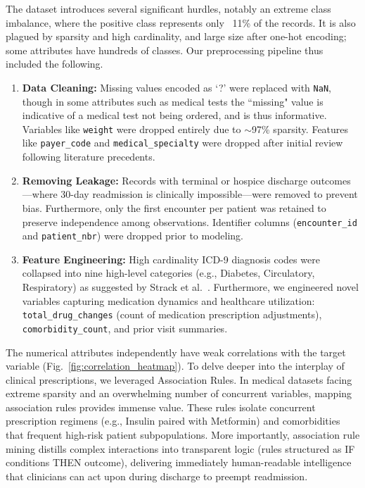 \documentclass[journal,onecolumn]{IEEEtran}
\begin{document}
The dataset introduces several significant hurdles, notably an extreme class imbalance, where the positive class represents only ~11\% of the records. It is also plagued by sparsity and high cardinality, and large size after one-hot encoding; some attributes have hundreds of classes. Our preprocessing pipeline thus included the following. 
\begin{enumerate}
    \item \textbf{Data Cleaning:} Missing values encoded as `?' were replaced with \texttt{NaN}, though in some attributes such as medical tests the ``missing" value is indicative of a medical test not being ordered, and is thus informative. Variables like \texttt{weight} were dropped entirely due to $\sim$97\% sparsity. Features like \texttt{payer\_code} and \texttt{medical\_specialty} were dropped after initial review following literature precedents. 
    \item \textbf{Removing Leakage:} Records with terminal or hospice discharge outcomes---where 30-day readmission is clinically impossible---were removed to prevent bias. Furthermore, only the first encounter per patient was retained to preserve independence among observations. Identifier columns (\texttt{encounter\_id} and \texttt{patient\_nbr}) were dropped prior to modeling.
    \item \textbf{Feature Engineering:} High cardinality ICD-9 diagnosis codes were collapsed into nine high-level categories (e.g., Diabetes, Circulatory, Respiratory) as suggested by Strack et al.~\cite{strack_impact_2014}. Furthermore, we engineered novel variables capturing medication dynamics and healthcare utilization: \texttt{total\_drug\_changes} (count of medication prescription adjustments), \texttt{comorbidity\_count}, and prior visit summaries.
\end{enumerate}

The numerical attributes independently have weak correlations with the target variable (Fig.~\ref{fig:correlation_heatmap}). To delve deeper into the interplay of clinical prescriptions, we leveraged Association Rules. In medical datasets facing extreme sparsity and an overwhelming number of concurrent variables, mapping association rules provides immense value. These rules isolate concurrent prescription regimens (e.g., Insulin paired with Metformin) and comorbidities that frequent high-risk patient subpopulations. More importantly, association rule mining distills complex interactions into transparent logic (rules structured as IF conditions THEN outcome), delivering immediately human-readable intelligence that clinicians can act upon during discharge to preempt readmission.
\end{document}
